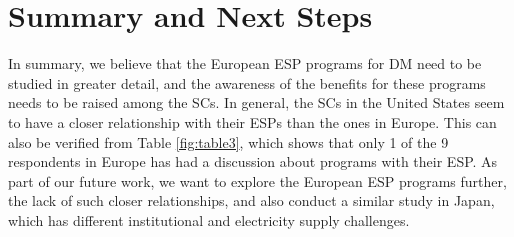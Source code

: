 \section{Summary and Next Steps}
\label{summary}


In summary, we believe that the European ESP programs for DM need to be studied in greater detail, and the awareness of the benefits for these programs needs to be raised among the SCs. In general, the SCs in the United States seem to have a closer relationship with their ESPs than the ones in Europe. This can also be verified from Table \ref{fig:table3}, which shows that only 1 of the 9 respondents in Europe has had a discussion about programs with their ESP. As part of our future work, we want to explore the European ESP programs further, the lack of such closer relationships, and also conduct a similar study in Japan, which has different institutional and electricity supply challenges.
